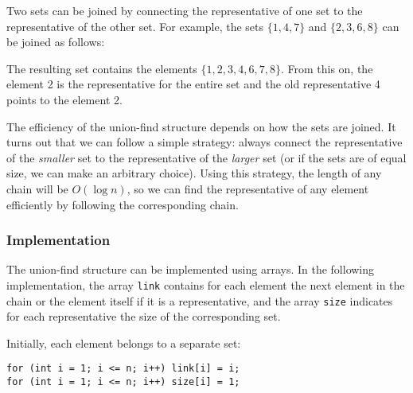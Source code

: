 Two sets can be joined by connecting the
representative of one set to the
representative of the other set.
For example, the sets
$\{1,4,7\}$ and $\{2,3,6,8\}$
can be joined as follows:
\begin{center}
\end{center}

The resulting set contains the elements
$\{1,2,3,4,6,7,8\}$.
From this on, the element 2 is the representative
for the entire set and the old representative 4
points to the element 2.

The efficiency of the union-find structure depends on
how the sets are joined.
It turns out that we can follow a simple strategy:
always connect the representative of the
\emph{smaller} set to the representative of the \emph{larger} set
(or if the sets are of equal size,
we can make an arbitrary choice).
Using this strategy, the length of any chain
will be $O(\log n)$, so we can
find the representative of any element
efficiently by following the corresponding chain.

\subsubsection{Implementation}

The union-find structure can be implemented
using arrays.
In the following implementation,
the array \texttt{link} contains for each element
the next element
in the chain or the element itself if it is
a representative,
and the array \texttt{size} indicates for each representative
the size of the corresponding set.

Initially, each element belongs to a separate set:
\begin{lstlisting}
for (int i = 1; i <= n; i++) link[i] = i;
for (int i = 1; i <= n; i++) size[i] = 1;
\end{lstlisting}

